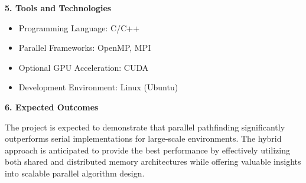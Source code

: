 \documentclass[11pt]{article}
\begin{document}
\textbf{5. Tools and Technologies}

\begin{itemize}[noitemsep]
    \item Programming Language: C/C++
    \item Parallel Frameworks: OpenMP, MPI
    \item Optional GPU Acceleration: CUDA
    \item Development Environment: Linux (Ubuntu)
\end{itemize}

\textbf{6. Expected Outcomes}

The project is expected to demonstrate that parallel pathfinding significantly outperforms serial implementations for large-scale environments. The hybrid approach is anticipated to provide the best performance by effectively utilizing both shared and distributed memory architectures while offering valuable insights into scalable parallel algorithm design.
\end{document}
